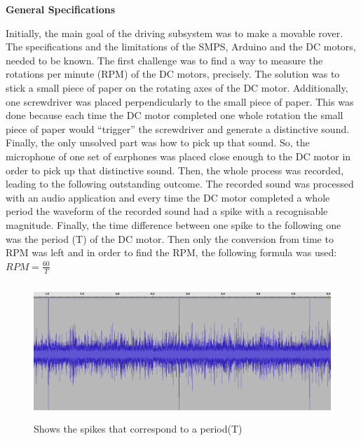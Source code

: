 \documentclass[a4paper]{article}
\begin{document}
\textbf{General Specifications}

Initially, the main goal of the driving subsystem was to make a movable rover. 
The specifications and the limitations of the SMPS, Arduino and the DC motors, 
needed to be known.  The first challenge was to find a way to measure the 
rotations per minute (RPM) of the DC motors, precisely. The solution was to 
stick a small piece of paper on the rotating axes of the DC motor. Additionally,
one screwdriver was placed perpendicularly to the small piece of paper. This was
done because each time the DC motor completed one whole rotation the small piece
of paper would ``trigger'' the screwdriver and generate a distinctive sound.
Finally, the only unsolved part was how to pick up that sound. So, the 
microphone of one set of earphones was placed close enough to the DC motor in order 
to pick up that distinctive sound. Then, the whole process was recorded, leading 
to the following outstanding outcome. The recorded sound was processed with an 
audio application and every time the DC motor completed a whole period the 
waveform of the recorded sound had a spike with a recognisable magnitude. 
Finally, the time difference between one spike to the following one was the 
period (T) of the DC motor. 
Then only the conversion from time to RPM was left and in order to find the RPM,
the following formula was used: \( RPM=\frac{60}{T} \) 


\begin{figure}[H]
\begin{Center}
\advance\leftskip 0.23in		
    \includegraphics[width=5.06in,height=2.02in]{./media/image2.png}
	\caption{Shows the spikes that correspond to a period(T)}
		\label{Shows the spikes that correspond to a period(T)}
\end{Center}
\end{figure}


\end{document}
